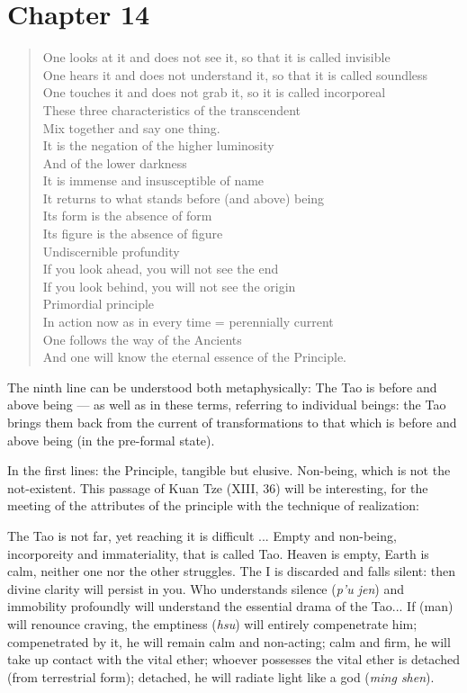 \section{Chapter 14}

\begin{verse}
One looks at it and does not see it, so that it is called invisible\\
One hears it and does not understand it, so that it is called soundless\\
One touches it and does not grab it, so it is called incorporeal\\
These three characteristics of the transcendent\\
Mix together and say one thing.\\
It is the negation of the higher luminosity\\
And of the lower darkness\\
It is immense and insusceptible of name\\
It returns to what stands before (and above) being\\
Its form is the absence of form\\
Its figure is the absence of figure\\
Undiscernible profundity\\
If you look ahead, you will not see the end\\
If you look behind, you will not see the origin\\
Primordial principle\\
In action now as in every time = perennially current \\
One follows the way of the Ancients\\
And one will know the eternal essence of the Principle.
\end{verse}

The ninth line can be understood both metaphysically: The Tao is before and above being --- as well as in these terms, referring to individual beings: the Tao brings them back from the current of transformations to that which is before and above being (in the pre-formal state).

In the first lines: the Principle, tangible but elusive. Non-being, which is not the not-existent. This passage of Kuan Tze (XIII, 36) will be interesting, for the meeting of the attributes of the principle with the technique of realization:

\begin{quotex}
The Tao is not far, yet reaching it is difficult ... Empty and non-being, incorporeity and immateriality, that is called Tao. Heaven is empty, Earth is calm, neither one nor the other struggles. The I is discarded and falls silent: then divine clarity will persist in you. Who understands silence (\emph{p'u jen}) and immobility profoundly will understand the essential drama of the Tao... If (man) will renounce craving, the emptiness (\emph{hsu}) will entirely compenetrate him; compenetrated by it, he will remain calm and non-acting; calm and firm, he will take up contact with the vital ether; whoever possesses the vital ether is detached (from terrestrial form); detached, he will radiate light like a god (\emph{ming shen}).
\end{quotex}


